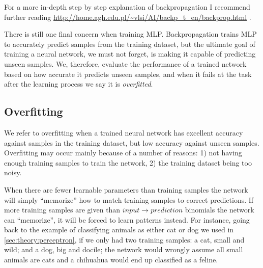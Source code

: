 

For a more in-depth step by step explanation of backpropagation I recommend further reading \url{http://home.agh.edu.pl/~vlsi/AI/backp_t_en/backprop.html} \cite{Bernacki2005}.

There is still one final concern when training MLP.
Backpropagation trains MLP to accurately predict samples from the training dataset, but the ultimate goal of training a neural network, we must not forget, is making it capable of predicting unseen samples.
We, therefore, evaluate the performance of a trained network based on how accurate it predicts unseen samples, and when it fails at the task after the learning process we say it is \emph{overfitted}.


\subsection{Overfitting}
\label{sec:theory:mlp:overfitting}

We refer to overfitting when a trained neural network has excellent accuracy against samples in the training dataset, but low accuracy against unseen samples.
Overfitting may occur mainly because of a number of reasons: 1) not having enough training samples to train the network, 2) the training dataset being too noisy.

When there are fewer learnable parameters than training samples the network will simply ``memorize'' how to match training samples to correct predictions.
If more training samples are given than $input \rightarrow prediction$ binomials the network can ``memorize'', it will be forced to learn patterns instead.
For instance, going back to the example of classifying animals as either cat or dog we used in \autoref{sec:theory:perceptron}, if we only had two training samples: a cat, small and wild; and a dog, big and docile; the network would wrongly assume all small animals are cats and a chihuahua would end up classified as a feline.

